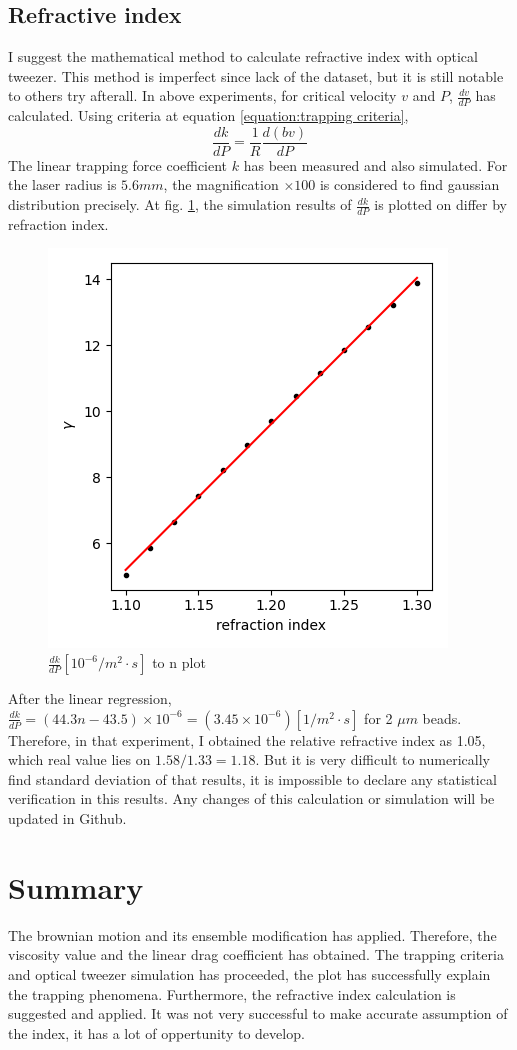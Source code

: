 \documentclass{article}
\begin{document}
\subsection{Refractive index}
\label{discussion:refractive_index_calculation}
I suggest the mathematical method to calculate refractive index with optical tweezer.
This method is imperfect since lack of the dataset, but it is still notable to others try afterall.
In above experiments, for critical velocity $v$ and $P$, $\frac{d v}{dP}$ has calculated.
Using criteria at equation \ref{equation:trapping criteria}, 
\begin{equation}
    \frac{dk}{dP} = \frac{1}{R} \frac{d (bv)}{dP}
\end{equation}
The linear trapping force coefficient $k$ has been measured and also simulated.
For the laser radius is $5.6 mm$, the magnification $\times 100$ is considered to find gaussian distribution precisely.
At  fig. \ref{Figure:final_fig}, the simulation results of $\frac{dk}{dP}$ is plotted on differ by refraction index.
\begin{figure}[h]
    \centering
    \includegraphics[width=0.3\linewidth]{../Final_figure.png}
    \caption{$\frac{dk}{dP} [10^{-6} /m^2 \cdot s]$ to n plot}
    \label{Figure:final_fig}
\end{figure}

After the linear regression, $\frac{dk}{dP} = (44.3 n  -43.5)\times 10^{-6} = (3.45 \times 10^{-6}) [1/m^2 \cdot s]$ for 2 $\mu m$ beads.
Therefore, in that experiment, I obtained the relative refractive index as 1.05, which real value lies on $1.58/1.33 = 1.18$.
But it is very difficult to numerically find standard deviation of that results, it is impossible to declare any statistical verification in this results.
Any changes of this calculation or simulation will be updated in Github.

\section{Summary}
The brownian motion and its ensemble modification has applied. Therefore, the viscosity value and the linear drag coefficient has obtained.
The trapping criteria and optical tweezer simulation has proceeded, the plot has successfully explain the trapping phenomena.
Furthermore, the refractive index calculation is suggested and applied.
It was not very successful to make accurate assumption of the index, it has a lot of oppertunity to develop.



\end{document}
